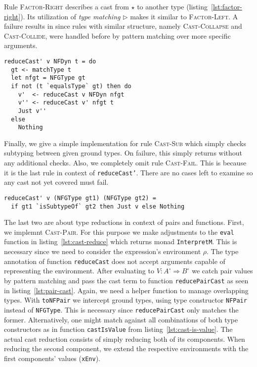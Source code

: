 Rule \textsc{Factor-Right} describes a cast from $\star$ to another type (listing~\ref{lst:factor-right}). Its utilization of \emph{type matching} $\rhd$ makes it similar to \textsc{Factor-Left}. A failure results in \blame since rules with similar structure, namely \textsc{Cast-Collapse} and \textsc{Cast-Collide}, were handled before by pattern matching over more specific arguments.

\begin{lstlisting}[float,
  caption=Rule \textsc{Factor-Right} (\texttt{Interpreter.hs}),
  label=lst:factor-right]
reduceCast' v NFDyn t = do
  gt <- matchType t
  let nfgt = NFGType gt
  if not (t `equalsType` gt) then do
    v'  <- reduceCast v NFDyn nfgt
    v'' <- reduceCast v' nfgt t
    Just v''
  else
    Nothing
\end{lstlisting}

Finally, we give a simple implementation for rule \textsc{Cast-Sub} which simply checks subtyping between given ground types. On failure, this simply returns \blame without any additional checks. Also, we completely omit rule \textsc{Cast-Fail}. This is because it is the last rule in context of \texttt{reduceCast'}. There are no cases left to examine so any cast not yet covered must fail.

\begin{lstlisting}[caption=Rule \textsc{Cast-Sub} (\texttt{Interpreter.hs})]
reduceCast' v (NFGType gt1) (NFGType gt2) =
  if gt1 `isSubtypeOf` gt2 then Just v else Nothing
\end{lstlisting}

The last two are about type reductions in context of pairs and functions. First, we implemnt \textsc{Cast-Pair}. For this purpose we make adjustments to the \texttt{eval} function in listing~\ref{lst:cast-reduce} which returns monad \texttt{InterpretM}. This is necessary since we need to consider the expression's environment $\rho$. The type annotation of function \texttt{reduceCast} does not accept arguments capable of representing the environment. After evaluating to $V : A^\circ \Rightarrow B^\circ$ we catch pair values by pattern matching and pass the cast term to function \texttt{reducePairCast} as seen in listing~\ref{lst:pair-cast}. Again, we need a helper function to manage overlapping types. With \texttt{toNFPair} we intercept ground types, using type constructor \texttt{NFPair} instead of \texttt{NFGType}. This is necessary since \texttt{reducePairCast} only matches the former. Alternatively, one might match against all combinations of both type constructors as in function \texttt{castIsValue} from listing~\ref{lst:cast-is-value}. The actual cast reduction consists of simply reducing both of its components. When reducing the second component, we extend the respective environments with the first components' values (\texttt{xEnv}).

